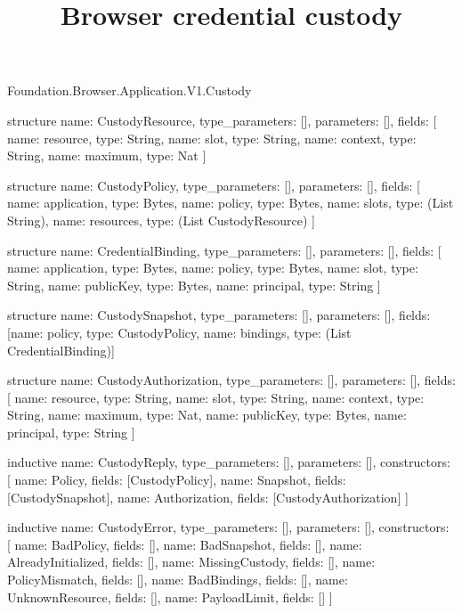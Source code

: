 \begin{lexlean}{Foundation.Browser.Application.V1.Custody}
\title{Browser credential custody}
\begin{semanticmodule}
structure{
  name: CustodyResource,
  type_parameters: [],
  parameters: [],
  fields: [
    {name: resource, type: String},
    {name: slot, type: String},
    {name: context, type: String},
    {name: maximum, type: Nat}
  ]
}

structure{
  name: CustodyPolicy,
  type_parameters: [],
  parameters: [],
  fields: [
    {name: application, type: Bytes},
    {name: policy, type: Bytes},
    {name: slots, type: (List String)},
    {name: resources, type: (List CustodyResource)}
  ]
}

structure{
  name: CredentialBinding,
  type_parameters: [],
  parameters: [],
  fields: [
    {name: application, type: Bytes},
    {name: policy, type: Bytes},
    {name: slot, type: String},
    {name: publicKey, type: Bytes},
    {name: principal, type: String}
  ]
}

structure{
  name: CustodySnapshot,
  type_parameters: [],
  parameters: [],
  fields: [{name: policy, type: CustodyPolicy}, {name: bindings, type: (List CredentialBinding)}]
}

structure{
  name: CustodyAuthorization,
  type_parameters: [],
  parameters: [],
  fields: [
    {name: resource, type: String},
    {name: slot, type: String},
    {name: context, type: String},
    {name: maximum, type: Nat},
    {name: publicKey, type: Bytes},
    {name: principal, type: String}
  ]
}

inductive{
  name: CustodyReply,
  type_parameters: [],
  parameters: [],
  constructors: [
    {name: Policy, fields: [CustodyPolicy]},
    {name: Snapshot, fields: [CustodySnapshot]},
    {name: Authorization, fields: [CustodyAuthorization]}
  ]
}

inductive{
  name: CustodyError,
  type_parameters: [],
  parameters: [],
  constructors: [
    {name: BadPolicy, fields: []},
    {name: BadSnapshot, fields: []},
    {name: AlreadyInitialized, fields: []},
    {name: MissingCustody, fields: []},
    {name: PolicyMismatch, fields: []},
    {name: BadBindings, fields: []},
    {name: UnknownResource, fields: []},
    {name: PayloadLimit, fields: []}
  ]
}


\end{semanticmodule}
\end{lexlean}
